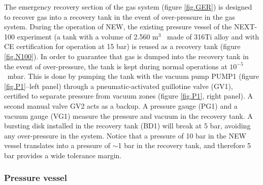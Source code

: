The emergency recovery section of the gas system (figure \ref{fig.GER}) is designed to recover gas into a recovery tank in the event of over-pressure in the gas system. During the operation of NEW, the existing pressure vessel of the NEXT-100 experiment (a tank with a volume of 2.560 m$^3$~ made of 316Ti alloy and with CE certification for operation at 15 bar) is reused as a recovery tank (figure \ref{fig.N100}). In order to guarantee that gas is dumped into the recovery tank in the event of over-pressure, the tank is kept during normal operations at $10^{-5}$~mbar. This is done by pumping the tank with the vacuum pump PUMP1 (figure \ref{fig.P1}--left panel)
through a pneumatic-activated guillotine valve (GV1), certified to separate pressure from 
vacuum zones (figure \ref{fig.P1}, right panel). A second manual valve GV2 acts as a backup. A pressure gauge (PG1) and a vacuum gauge (VG1) measure the pressure and vacuum in the recovery tank. A bursting disk installed in the recovery tank (BD1) will break at 5 bar, avoiding any over-pressure in the system. Notice that a pressure of 10 bar in the NEW vessel translates into a pressure of $\sim$1 bar in the recovery tank, and therefore 5 bar provides a wide tolerance margin.   


\subsubsection*{Pressure vessel}

